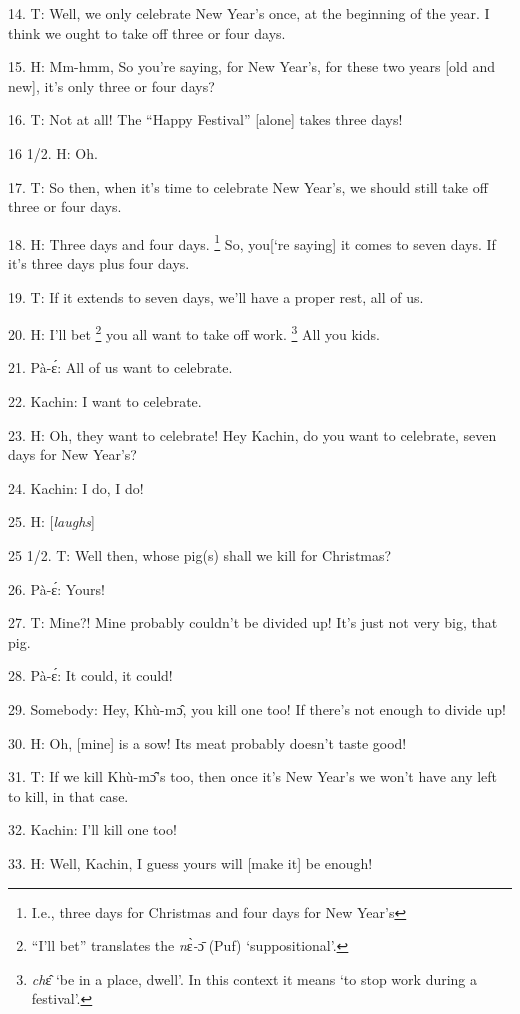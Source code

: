 14. T: Well, we only celebrate New Year's once, at the beginning of the year.
I think we ought to take off three or four days.

15. H: Mm-hmm,  So you're saying, for New Year's, for these two years [old and
new], it's only three or four days?

16. T: Not at all!  The ``Happy Festival''  [alone] takes three days!

16 1/2. H: Oh.

17. T: So then, when it's time to celebrate New Year's, we should still take off
three or four days.

18. H: Three days and four days. \footnote{I.e., three days for Christmas and four days for New Year's} So, you[`re saying] it comes to seven days.
If it's three days plus four days.

19. T: If it extends to seven days, we'll have a proper rest, all of us.

20. H: I'll bet \footnote{``I'll bet'' translates the \textit{n}ɛ̀\textit{-}ɔ̄ (Puf) `suppositional'.} you all want to take off work. \footnote{\textit{ch}ɛ̂ `be in a place, dwell'. In this context it means `to stop work during a festival'.}  All you kids.

21. Pà-ɛ́: All of us want to celebrate.

22. Kachin: I want to celebrate.

23. H: Oh, they want to celebrate!  Hey Kachin, do you want to celebrate, seven
days for New Year's?

24. Kachin: I do, I do!

25. H: [\textit{laughs}]

25 1/2. T: Well then, whose pig(s) shall we kill for Christmas?

26. Pà-ɛ́: Yours!

27. T: Mine?!  Mine probably couldn't be divided up!  It's just not very big, that
pig.

28. Pà-ɛ́: It could, it could!

29. Somebody: Hey, Khù-mɔ̂, you kill one too!  If there's not enough to divide
up!

30. H: Oh, [mine] is a sow!  Its meat probably doesn't taste good!

31. T: If we kill Khù-mɔ̂'s too, then once it's New Year's we won't have any
left to kill, in that case.

32. Kachin: I'll kill one too!

33. H: Well, Kachin, I guess yours will [make it] be enough!

